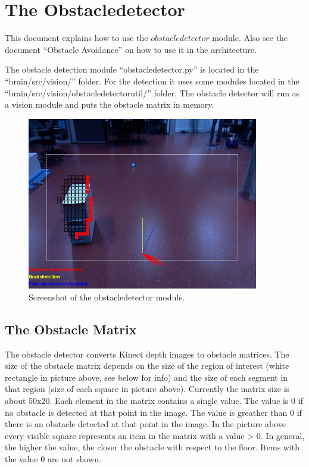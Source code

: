 \documentclass[a4paper, 12pt, oneside]{report}
\title{\titleVariable}
\author{\authorVariable}
\date{\centering First release: \firstRelease \\ Last modification: \today}
\begin{document}
\maketitle

\chapter{The Obstacledetector}

This document explains how to use the $obstacledetector$ module. 
Also see the document ``Obstacle Avoidance'' on how to use it in the architecture.

The obstacle detection module ``obstacledetector.py'' is located in the ``brain/src/vision/'' folder. 
For the detection it uses some modules located in the ``brain/src/vision/obstacledetectorutil/'' folder. 
The obstacle detector will run as a vision module and puts the obstacle matrix in memory.

\begin{figure}[H]
    \centering
    \includegraphics[width=0.9\textwidth]{img/obstacledetector_example.png}
    \caption{Screenshot of the obstacledetector module.\label{fig:example}}
\end{figure}

\section{The Obstacle Matrix}

The obstacle detector converts Kinect depth images to obstacle matrices. 
The size of the obstacle matrix depends on the size of the region of interest (white rectangle in picture above, see below for info) and the size of each segment in that region (size of each square in picture above). 
Currently the matrix size is about 50x20. 
Each element in the matrix contains a single value. 
The value is 0 if no obstacle is detected at that point in the image. 
The value is greather than 0 if there is an obstacle detected at that point in the image. 
In the picture above every visible square represents an item in the matrix with a value > 0. 
In general, the higher the value, the closer the obstacle with respect to the floor. Items with the value 0 are not shown.
\end{document}
